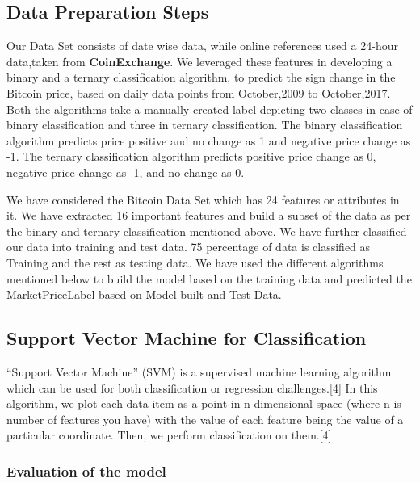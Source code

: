 \documentclass{article}
\begin{document}
\subsection {Data Preparation Steps}
Our Data Set consists of date wise data, while online references used a 24-hour data,taken from \textbf{CoinExchange}. We leveraged these features in developing a binary and a ternary classification algorithm, to predict the sign change in the Bitcoin price, based on daily data points from October,2009 to October,2017. Both the algorithms take a manually created label depicting two classes in case of binary classification and three in ternary classification. The binary classification algorithm predicts price positive and no change as 1 and negative price change as -1. The ternary classification algorithm predicts positive price change as 0, negative price change as -1, and no change as 0. \newline

We have considered the Bitcoin Data Set which has 24 features or attributes in it. We have extracted 16 important features and build a subset of the data as per the binary and ternary classification mentioned above. We have further classified our data into training and test data. 75 percentage of data is classified as Training and the rest as testing data. We have used the different algorithms mentioned below to build the model based on the training data and predicted the Market\textunderscore Price\textunderscore Label based on Model built and Test Data.\newline



\subsection {Support Vector Machine for Classification}

“Support Vector Machine” (SVM) is a supervised machine learning algorithm which can be used for both classification or regression challenges.[4] In this algorithm, we plot each data item as a point in n-dimensional space (where n is number of features you have) with the value of each feature being the value of a particular coordinate. Then, we perform classification on them.[4] 

\subsubsection{Evaluation of the model}\newline
\end{document}
